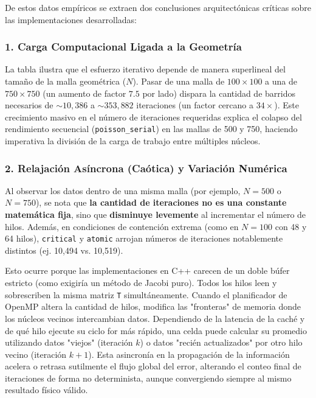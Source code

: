 De estos datos empíricos se extraen dos conclusiones arquitectónicas críticas sobre las implementaciones desarrolladas:

\subsubsection{1. Carga Computacional Ligada a la Geometría}
La tabla ilustra que el esfuerzo iterativo depende de manera superlineal del tamaño de la malla geométrica ($N$). Pasar de una malla de $100 \times 100$ a una de $750 \times 750$ (un aumento de factor $7.5$ por lado) dispara la cantidad de barridos necesarios de $\sim 10,386$ a $\sim 353,882$ iteraciones (un factor cercano a $34\times$). Este crecimiento masivo en el número de iteraciones requeridas explica el colapso del rendimiento secuencial (\texttt{poisson\_serial}) en las mallas de 500 y 750, haciendo imperativa la división de la carga de trabajo entre múltiples núcleos.

\subsubsection{2. Relajación Asíncrona (Caótica) y Variación Numérica}
Al observar los datos dentro de una misma malla (por ejemplo, $N=500$ o $N=750$), se nota que \textbf{la cantidad de iteraciones no es una constante matemática fija}, sino que \textbf{disminuye levemente} al incrementar el número de hilos. Además, en condiciones de contención extrema (como en $N=100$ con 48 y 64 hilos), \texttt{critical} y \texttt{atomic} arrojan números de iteraciones notablemente distintos (ej. 10,494 vs. 10,519).

Esto ocurre porque las implementaciones en C++ carecen de un doble búfer estricto (como exigiría un método de Jacobi puro). Todos los hilos leen y sobrescriben la misma matriz \texttt{T} simultáneamente. Cuando el planificador de OpenMP altera la cantidad de hilos, modifica las "fronteras" de memoria donde los núcleos vecinos intercambian datos. 
Dependiendo de la latencia de la caché y de qué hilo ejecute su ciclo for más rápido, una celda puede calcular su promedio utilizando datos "viejos" (iteración $k$) o datos "recién actualizados" por otro hilo vecino (iteración $k+1$). Esta asincronía en la propagación de la información acelera o retrasa sutilmente el flujo global del error, alterando el conteo final de iteraciones de forma no determinista, aunque convergiendo siempre al mismo resultado físico válido.





